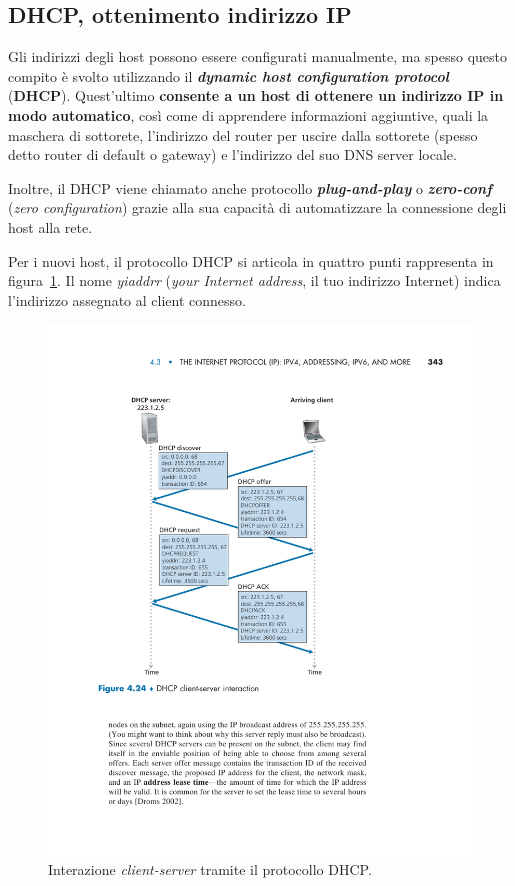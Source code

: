 \documentclass[a4paper]{article}
\begin{document}
	\subsection{DHCP, ottenimento indirizzo IP}
	
	Gli indirizzi degli host possono essere configurati manualmente, ma spesso questo compito è svolto utilizzando il \textcolor{Red3}{\textbf{\emph{dynamic host configuration protocol}}} (\textbf{DHCP}). Quest’ultimo \textbf{consente a un host di ottenere un indirizzo IP in modo automatico}, così come di apprendere informazioni aggiuntive, quali la maschera di sottorete, l’indirizzo del router per uscire dalla sottorete (spesso detto router di default o gateway) e l’indirizzo del suo DNS server locale.\newline
	
	\noindent
	Inoltre, il DHCP viene chiamato anche protocollo \textbf{\emph{plug-and-play}} o \textbf{\emph{zero-conf}} (\emph{zero configuration}) grazie alla sua capacità di automatizzare la connessione degli host alla rete.\newline
	
	\noindent
	Per i nuovi host, il protocollo DHCP si articola in quattro punti rappresenta in figura~\ref{DHCP immagine}. Il nome \emph{yiaddrr} (\emph{your Internet address}, il tuo indirizzo Internet) indica l'indirizzo assegnato al client connesso.
	\begin{figure}[!htp]
		\centering
		\includegraphics[width=\textwidth]{img/DHCP.pdf}
		\caption{Interazione \emph{client-server} tramite il protocollo DHCP.}\label{DHCP immagine}
	\end{figure}\newpage
	
\end{document}
